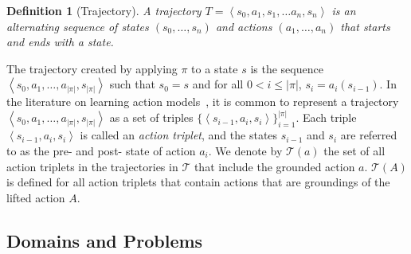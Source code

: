 \documentclass{article}
\newtheorem{definition}{Definition}
\newcommand{\tuple}[1]{\ensuremath{\left \langle #1 \right \rangle }}
\newcommand{\lifta}{A}
\begin{document}
\begin{definition}[Trajectory]
A trajectory $T=\tuple{s_0, a_1, s_1, \ldots a_n, s_n}$ is an alternating sequence of states $(s_0,\ldots,s_n)$ and actions $(a_1,\ldots,a_n)$ that starts and ends with a state.
\end{definition}
The trajectory created by applying $\pi$ to a state $s$ is 
the sequence $\tuple{s_0, a_1, \ldots, a_{|\pi|}, s_{|\pi|}}$ such that 
$s_0=s$ and for all $0<i\leq |\pi|$, $s_i=a_i(s_{i-1})$. 
In the literature on learning action models~\cite{wang1994learning,wang1995learning,walsh2008efficient,stern2017efficientAndSafe,arora2018review}, 
it is common to represent a trajectory 
$\tuple{s_0, a_1, \ldots, a_{|\pi|}, s_{|\pi|}}$
as a set of triples 
$\big\{\tuple{s_{i-1},a_i,s_i}\big\}_{i=1}^{|\pi|}$.
Each triple $\tuple{s_{i-1},a_i,s_i}$ is called an \emph{action triplet},  and the states $s_{i-1}$ and $s_i$ are referred to as the pre- and post- state of action $a_i$. 
We denote by $\mathcal{T}(a)$ the set of all action triplets in the trajectories in $\mathcal{T}$ that include the grounded action $a$. $\mathcal{T}(\lifta)$ is defined for all action triplets that contain actions that are groundings of the lifted action $\lifta$.  

\subsection{Domains and Problems}
\end{document}
